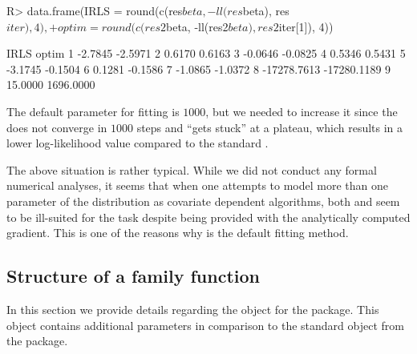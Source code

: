\documentclass[
]{jss}
\newcommand{\1}{\mathcal{I}} \newcommand{\bZero}{\boldsymbol{0}}
\begin{document}
\begin{CodeChunk}
\begin{CodeInput}
R> data.frame(IRLS  = round(c(res$beta, -ll(res$beta), res$iter), 4),
+            optim = round(c(res2$beta, -ll(res2$beta), res2$iter[1]), 4))
\end{CodeInput}
\begin{CodeOutput}
         IRLS       optim
1     -2.7845     -2.5971
2      0.6170      0.6163
3     -0.0646     -0.0825
4      0.5346      0.5431
5     -3.1745     -0.1504
6      0.1281     -0.1586
7     -1.0865     -1.0372
8 -17278.7613 -17280.1189
9     15.0000   1696.0000
\end{CodeOutput}
\end{CodeChunk}

The default  parameter for  fitting is
\(1000\), but we needed to increase it since the  does not
converge in \(1000\) steps and ``gets stuck'' at a plateau, which
results in a lower log-likelihood value compared to the standard
.

The above situation is rather typical. While we did not conduct any
formal numerical analyses, it seems that when one attempts to model more
than one parameter of the distribution as covariate dependent
 algorithms, both  and 
seem to be ill-suited for the task despite being provided with the
analytically computed gradient. This is one of the reasons why
 is the default fitting method.

\clearpage

\subsection{Structure of a family function}\label{sec-family}

In this section we provide details regarding the  object
for the  package. This object contains additional
parameters in comparison to the standard  object from the
 package.
\end{document}
